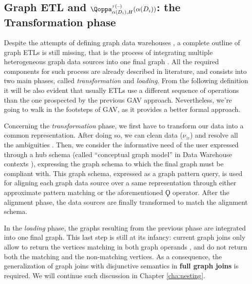 \subsection{Graph ETL and $\qtransl^{\tau(\textup{--})}_{\abstr(D_i),H}(\abstr(D_i))$: the Transformation phase}\label{sec:ngusecases}

Despite the attempts of defining graph data warehouses \cite{Etcheverry2012a,EtcheverryV12b,
	Zhao11}, a complete outline of graph ETLs is still missing, that is the process of 
integrating multiple heterogeneous graph data sources into one final graph \cite{ChenYZHY08}. 
All the required components for such process are already described in literature, and consists
into two main phases, called \textit{transformation} and \textit{loading}. From the following definition it will be also evident that usually ETLs use a different sequence of operations than the one prospected by the previous GAV approach. Nevertheless, we're going to walk in the footsteps of GAV, as it provides a better formal approach.

Concerning the \textit{transformation} phase, we first have to transform our data into a common representation. After doing so, we can clean data ($\nu_\cong$) and resolve
all the ambiguities \cite{rahm2016case}. Then, we consider the informative need
of the user expressed through a hub schema (called ``conceptual graph model'' in Data Warehouse contexts \cite{jakawat}), expressing the
graph schema to which the final graph must be compliant with. This graph schema, expressed
as a graph pattern query, is used for aligning each graph data source \cite{Aligon201520}
over a same representation through either approximate pattern matching \cite{DeVirgilio2015} or the aforementioned $\Qoppa$ operator. After the alignment phase, the data sources are finally transformed to match the alignment schema. 

In the \textit{loading} phase, the graphs resulting from the previous phase
are integrated into one final graph. This last step is still at its infancy:
current graph joins only allow to return the vertices matching in both graph operands
\cite{BergamiMM17}, and do not return both the matching and the non-matching vertices.
As a consequence, the generalization of graph joins with
disjunctive semantics in \textbf{full graph joins} is required. We will continue such discussion in Chapter \vref{cha:nesting}.


